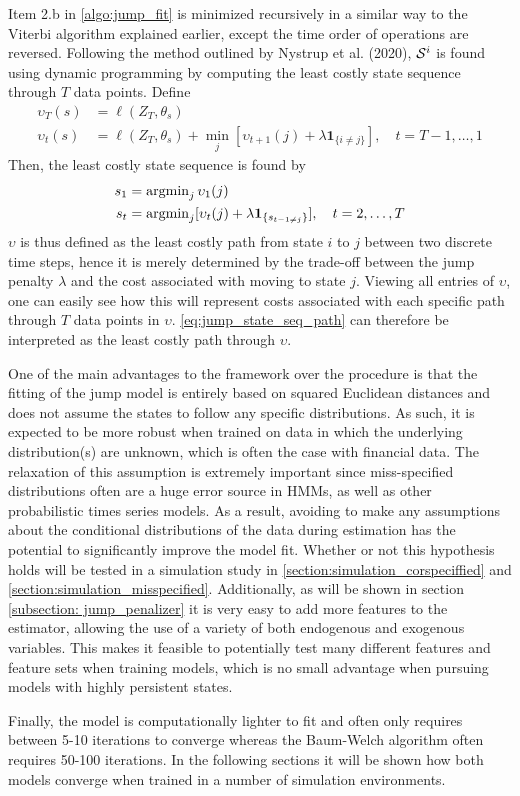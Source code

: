 Item 2.b in \cref{algo:jump_fit} is minimized recursively in a similar way to the Viterbi algorithm explained earlier, except the time order of operations are reversed. Following the method outlined by Nystrup et al. (2020), $\S^i$ is found using dynamic programming by computing the least costly state sequence through $T$ data points. Define
\begin{align}
    \upsilon_T(s) &= \ell(Z_T, \theta_s) \\
    \upsilon_t(s) &= \ell(Z_T, \theta_s) + \min_j[\upsilon_{t+1}(j) + \lambda\mathbf{1}_{\{ i\ne j \}}],
    \quad t=T-1,\ldots,1
\label{eq:jump_cost_path}
\end{align}
Then, the least costly state sequence is found by
\begin{align}
    s_1 &= \argmin_j \upsilon_1(j) \\
    s_t &= \argmin_j[\upsilon_t(j) + \lambda\mathbf{1}_{\{ s_{t-1 \ne j} \}}], \quad t=2,\ldots,T
    \label{eq:jump_state_seq_path}
\end{align}
$\upsilon$ is thus defined as the least costly path from state $i$ to $j$ between two discrete time steps, hence it is merely determined by the trade-off between the jump penalty $\lambda$ and the cost associated with moving to state $j$. Viewing all entries of $\upsilon$, one can easily see how this will represent costs associated with each specific path through $T$ data points in $\upsilon$. \cref{eq:jump_state_seq_path} can therefore be interpreted as the least costly path through $\upsilon$. 

One of the main advantages to the \jump framework over the \mle procedure is that the fitting of the jump model is entirely based on squared Euclidean distances and does not assume the states to follow any specific distributions. As such, it is expected to be more robust when trained on data in which the underlying distribution(s) are unknown, which is often the case with financial data. The relaxation of this assumption is extremely important since miss-specified distributions often are a huge error source in HMMs, as well as other probabilistic times series models. As a result, avoiding to make any assumptions about the conditional distributions of the data during estimation has the potential to significantly improve the model fit. Whether or not this hypothesis holds will be tested in a simulation study in \cref{section:simulation_corspeciffied} and \cref{section:simulation_misspecified}. Additionally, as will be shown in section \ref{subsection: jump_penalizer} it is very easy to add more features to the estimator, allowing the use of a variety of both endogenous and exogenous variables. This makes it feasible to potentially test many different features and feature sets when training models, which is no small advantage when pursuing models with highly persistent states.

Finally, the model is computationally lighter to fit and often only requires between 5-10 iterations to converge whereas the Baum-Welch algorithm often requires 50-100 iterations. In the following sections it will be shown how both models converge when trained in a number of simulation environments. 

